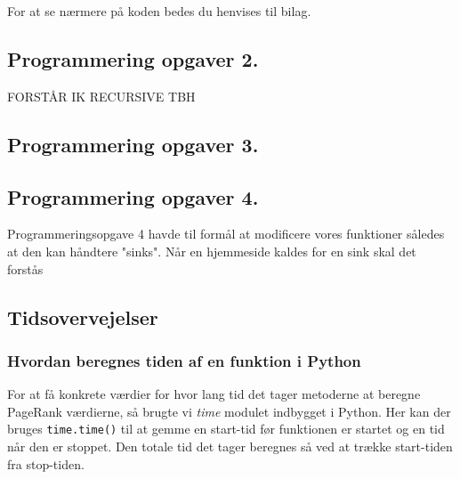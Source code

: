 For at se nærmere på koden bedes du henvises til bilag.

\subsection{Programmering opgaver 2.}

FORSTÅR IK RECURSIVE TBH

\subsection{Programmering opgaver 3.}


\subsection*{Programmering opgaver 4.}
Programmeringsopgave 4 havde til formål at modificere vores funktioner således at den kan håndtere "sinks". Når en hjemmeside kaldes for en sink skal det forstås 

\subsection*{Tidsovervejelser}
\subsubsection*{Hvordan beregnes tiden af en funktion i Python}
For at få konkrete værdier for hvor lang tid det tager metoderne at beregne PageRank værdierne, så brugte vi \emph{time} modulet indbygget i Python. Her kan der bruges \texttt{time.time()} til at gemme en start-tid før funktionen er startet og en tid når den er stoppet. Den totale tid det tager beregnes så ved at trække start-tiden fra stop-tiden.

